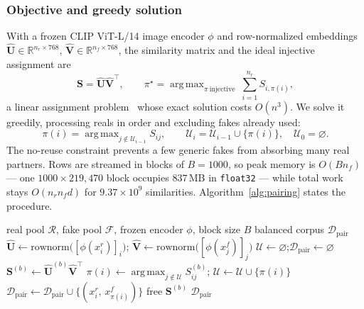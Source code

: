 \documentclass[10pt,journal]{IEEEtran}
\newcommand{\mat}[1]{\mathbf{#1}}
\newcommand{\real}{\mathbb{R}}
\DeclareMathOperator*{\argmax}{arg\,max}
\begin{document}
\subsubsection{Objective and greedy solution}
With a frozen CLIP ViT-L/14 image encoder $\phi$ and row-normalized embeddings
$\hat{\mat{U}}\in\real^{n_r\times768}$, $\hat{\mat{V}}\in\real^{n_f\times768}$,
the similarity matrix and the ideal injective assignment are
\begin{equation}
\mat{S}=\hat{\mat{U}}\hat{\mat{V}}^{\!\top},\qquad
\pi^\star=\argmax_{\pi\ \text{injective}}\ \sum_{i=1}^{n_r}S_{i,\pi(i)},
\label{eq:assignment}
\end{equation}
a linear assignment problem~\cite{kuhn1955hungarian,burkard2012assignment}
whose exact solution costs $O(n^3)$. We solve it greedily, processing reals in
order and excluding fakes already used:
\begin{equation}
\pi(i)=\argmax_{j\notin\mathcal{U}_{i-1}} S_{ij},\qquad
\mathcal{U}_i=\mathcal{U}_{i-1}\cup\{\pi(i)\},\quad\mathcal{U}_0=\varnothing .
\label{eq:greedy}
\end{equation}
The no-reuse constraint prevents a few generic fakes from absorbing many real
partners. Rows are streamed in blocks of $B=1000$, so peak memory is
$O(Bn_f)$ --- one $1000\times219{,}470$ block occupies $837$\,MB in
\texttt{float32} --- while total work stays $O(n_rn_fd)$ for
$9.37\times10^{9}$ similarities. Algorithm~\ref{alg:pairing} states the
procedure.

\begin{algorithm}[!t]
\caption{CLIP-Similarity-Guided One-to-One Subsampling}
\label{alg:pairing}
\begin{algorithmic}[1]
\Require real pool $\mathcal{R}$, fake pool $\mathcal{F}$, frozen encoder
         $\phi$, block size $B$
\Ensure  balanced corpus $\mathcal{D}_{\mathrm{pair}}$
\State $\hat{\mat{U}}\gets \mathrm{rownorm}\big([\phi(x^r_i)]_i\big)$;\quad
       $\hat{\mat{V}}\gets \mathrm{rownorm}\big([\phi(x^f_j)]_j\big)$
\State $\mathcal{U}\gets\varnothing$;\quad $\mathcal{D}_{\mathrm{pair}}\gets\varnothing$
    \State $\mat{S}^{(b)}\gets \hat{\mat{U}}^{(b)}\hat{\mat{V}}^{\!\top}$
        \State $\pi(i)\gets\argmax_{j\notin\mathcal{U}} S^{(b)}_{ij}$;\quad
               $\mathcal{U}\gets\mathcal{U}\cup\{\pi(i)\}$
        \State $\mathcal{D}_{\mathrm{pair}}\gets\mathcal{D}_{\mathrm{pair}}
                \cup\{(x^r_i,\,x^f_{\pi(i)})\}$
    \EndFor
    \State free $\mat{S}^{(b)}$
\EndFor
\State \Return $\mathcal{D}_{\mathrm{pair}}$
\end{algorithmic}
\end{algorithm}
\end{document}
